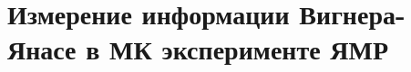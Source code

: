 \chapter{Измерение информации Вигнера-Янасе в МК эксперименте ЯМР}
\label{chapter:wyi-mesuarement}


